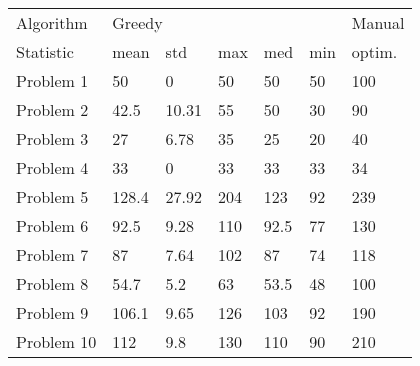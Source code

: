 \begin{tabular}{lllllll}
\toprule
Algorithm & \multicolumn{5}{l}{Greedy} & Manual \\
Statistic &   mean &    std &  max &   med & min & optim. \\
\midrule
Problem 1  &     50 &      0 &   50 &    50 &  50 &    100 \\
Problem 2  &   42.5 &  10.31 &   55 &    50 &  30 &     90 \\
Problem 3  &     27 &   6.78 &   35 &    25 &  20 &     40 \\
Problem 4  &     33 &      0 &   33 &    33 &  33 &     34 \\
Problem 5  &  128.4 &  27.92 &  204 &   123 &  92 &    239 \\
Problem 6  &   92.5 &   9.28 &  110 &  92.5 &  77 &    130 \\
Problem 7  &     87 &   7.64 &  102 &    87 &  74 &    118 \\
Problem 8  &   54.7 &    5.2 &   63 &  53.5 &  48 &    100 \\
Problem 9  &  106.1 &   9.65 &  126 &   103 &  92 &    190 \\
Problem 10 &    112 &    9.8 &  130 &   110 &  90 &    210 \\
\bottomrule
\end{tabular}
